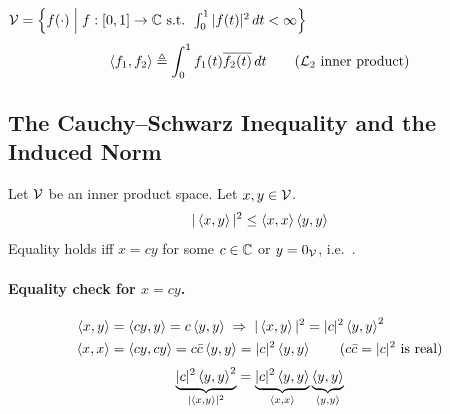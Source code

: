 \begin{example}
$\mathcal{V} = \left\{ f(\cdot) \;\middle|\; f:[0,1]\to\mathbb{C} \text{ s.t. } \int_0^1 |f(t)|^2\,dt < \infty\right\}$
\[
\left\langle f_1, f_2 \right\rangle \triangleq \int_0^1 f_1(t)\overline{f_2(t)}\,dt \qquad (\mathcal{L}_2 \text{ inner product})
\]
\end{example}
\subsection{The Cauchy--Schwarz Inequality and the Induced Norm}\label{ss:cauchy-schwarz}
\begin{theorem}
Let $\mathcal{V}$ be an inner product space. Let $x,y\in\mathcal{V}$.
\[
|\left\langle x, y \right\rangle|^2 \le \left\langle x, x \right\rangle\left\langle y, y \right\rangle
\]
Equality holds iff $x = cy$ for some $c\in\mathbb{C}$ or $y = 0_{\mathcal{V}}$, i.e.\ .
\end{theorem}
\paragraph{Equality check for $x = cy$.}
\begin{align*}
\left\langle x, y \right\rangle &= \left\langle cy, y \right\rangle = c\left\langle y, y \right\rangle \;\Rightarrow\; |\left\langle x, y \right\rangle|^2 = |c|^2\left\langle y, y \right\rangle^2\\
\left\langle x, x \right\rangle &= \left\langle cy, cy \right\rangle = c\bar c\left\langle y, y \right\rangle = |c|^2\left\langle y, y \right\rangle \qquad (c\bar c = |c|^2 \text{ is real})
\end{align*}
\[
\underbrace{|c|^2\left\langle y, y \right\rangle^2}_{|\left\langle x, y \right\rangle|^2} = \underbrace{|c|^2\left\langle y, y \right\rangle}_{\left\langle x, x \right\rangle}\underbrace{\left\langle y, y \right\rangle}_{\left\langle y, y \right\rangle}
\]

